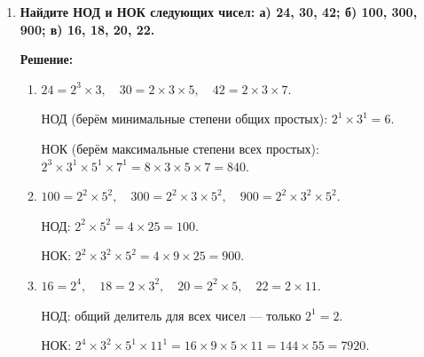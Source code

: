 \documentclass[12pt, a4paper]{article}
\begin{document}
\begin{enumerate}[label=\arabic*., wide=0pt, leftmargin=*]
\textbf{Решение:} 
Сумма делителей вычисляется по формуле:
\[
\sigma(n) = \frac{p_1^{\alpha_1+1}-1}{p_1-1} \cdot \frac{p_2^{\alpha_2+1}-1}{p_2-1} \cdots
\]
\[
\begin{aligned}
&\text{а)}\ 13 = 13^1 \quad\Rightarrow\quad \frac{13^2-1}{13-1} = \frac{169-1}{12} = \frac{168}{12} = 14\ (1+13).\\
&\text{б)}\ 28 = 2^2 \times 7^1 \quad\Rightarrow\quad \frac{2^3-1}{2-1} \cdot \frac{7^2-1}{7-1} = \frac{8-1}{1} \cdot \frac{49-1}{6} = 7 \cdot \frac{48}{6} = 7 \cdot 8 = 56.\\
&\text{в)}\ 64 = 2^6 \quad\Rightarrow\quad \frac{2^7-1}{2-1} = \frac{128-1}{1} = 127.\\
&\text{г)}\ 300 = 2^2 \times 3^1 \times 5^2 \quad\Rightarrow\quad 
\frac{2^3-1}{1} \cdot \frac{3^2-1}{2} \cdot \frac{5^3-1}{4} = \\ 
&\qquad\qquad\qquad\qquad\qquad\; = 7 \cdot \frac{9-1}{2} \cdot \frac{125-1}{4} = 
7 \cdot \frac{8}{2} \cdot \frac{124}{4} = 7 \cdot 4 \cdot 31 = 868.
\end{aligned}
\]

\item \textbf{Найдите НОД и НОК следующих чисел: а) 24, 30, 42; б) 100, 300, 900; в) 16, 18, 20, 22.}

\textbf{Решение:}

\begin{enumerate}[label=\alph*), wide=0pt, leftmargin=*]
\item 
\(24 = 2^3 \times 3,\quad 30 = 2 \times 3 \times 5,\quad 42 = 2 \times 3 \times 7.\)

НОД (берём минимальные степени общих простых): \(2^1 \times 3^1 = 6.\)

НОК (берём максимальные степени всех простых): \(2^3 \times 3^1 \times 5^1 \times 7^1 = 8 \times 3 \times 5 \times 7 = 840.\)

\item 
\(100 = 2^2 \times 5^2,\quad 300 = 2^2 \times 3 \times 5^2,\quad 900 = 2^2 \times 3^2 \times 5^2.\)

НОД: \(2^2 \times 5^2 = 4 \times 25 = 100.\)

НОК: \(2^2 \times 3^2 \times 5^2 = 4 \times 9 \times 25 = 900.\)

\item 
\(16 = 2^4,\quad 18 = 2 \times 3^2,\quad 20 = 2^2 \times 5,\quad 22 = 2 \times 11.\)

НОД: общий делитель для всех чисел — только \(2^1 = 2.\)

НОК: \(2^4 \times 3^2 \times 5^1 \times 11^1 = 16 \times 9 \times 5 \times 11 = 144 \times 55 = 7920.\)
\end{enumerate}


\end{enumerate}
\end{document}
